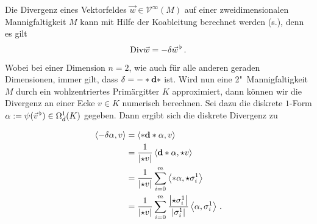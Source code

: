   \begin{beispiel}[Divergenz]
    \label{bspDivergenz}
    Die Divergenz eines Vektorfeldes \( \vec{w}\in\mathcal{V}^{\infty}(M) \) auf einer zweidimensionalen Mannigfaltigkeit \( M \) kann mit Hilfe 
    der Koableitung berechnet werden (s.\cite{Marsden}), denn es gilt
    \begin{align}
      \text{Div}\vec{w} = -\delta\vec{w}^{\,\flat} \,\text{.}
    \end{align}
    Wobei bei einer Dimension \( n=2 \), wie auch für alle anderen geraden Dimensionen, immer gilt, dass \( \delta = -*\mathbf{d} * \) ist.
    Wird nun eine 2"~Mannigfaltigkeit \( M \) durch ein wohlzentriertes Primärgitter \( K \) approximiert, 
    dann können wir die Divergenz an einer Ecke \( v\in K \) numerisch berechnen.
    Sei dazu die diskrete \( 1 \)-Form 
    \( \alpha:=\psi(\vec{v}^{\,\flat})\in\Omega_{d}^{1}(K) \)
    gegeben.
    Dann ergibt sich die diskrete Divergenz zu\\
    \begin{minipage}[b]{0.3\textwidth}
        \centering
    \end{minipage}
    \hfill
    \begin{minipage}[b]{0.6\textwidth}
    \begin{align}
    \begin{aligned}
      \left\langle -\delta\alpha,v \right\rangle
          &= \left\langle *\mathbf{d} * \alpha , v \right\rangle \\
          &= \frac{1}{\left| \star v \right|} \left\langle \mathbf{d} * \alpha , \star v \right\rangle \\
          &= \frac{1}{\left| \star v \right|} \sum_{i=0}^{m} \left\langle *\alpha , \star\sigma^{1}_{i} \right\rangle \\
          &= \frac{1}{\left| \star v \right|} \sum_{i=0}^{m} \frac{\left| \star\sigma^{1}_{i} \right|}{\left|\sigma^{1}_{i} \right|}
                                                              \left\langle \alpha , \sigma^{1}_{i} \right\rangle
                                                              \,\text{.}
    \end{aligned}
    \end{align}
    \end{minipage}
  \end{beispiel}

